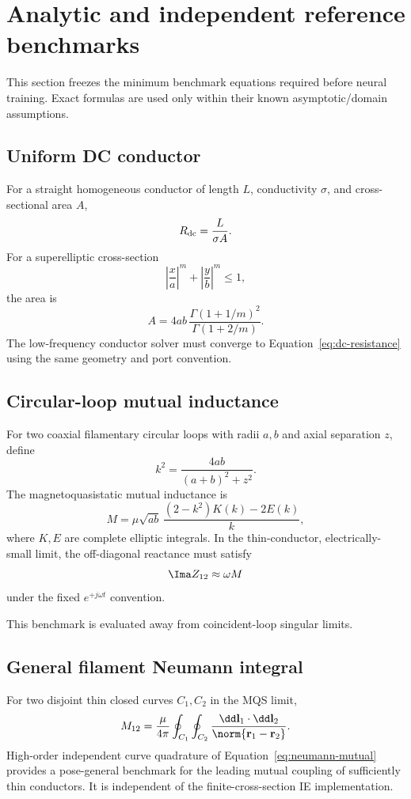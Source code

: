 \section{Analytic and independent reference benchmarks}
\label{sec:analytic-benchmarks}

This section freezes the minimum benchmark equations required before neural
training. Exact formulas are used only within their known asymptotic/domain
assumptions.

\subsection{Uniform DC conductor}

For a straight homogeneous conductor of length $L$, conductivity $\sigma$, and
cross-sectional area $A$,
\[
  R_{\rm dc}
  =
  \frac{L}{\sigma A}.
  \label{eq:dc-resistance}
\]
For a superelliptic cross-section
\[
 \left|\frac{x}{a}\right|^m+
 \left|\frac{y}{b}\right|^m\le1,
\]
the area is
\[
 A
 =
 4ab\,
 \frac{\Gamma(1+1/m)^2}
      {\Gamma(1+2/m)}.
 \label{eq:superellipse-area}
\]
The low-frequency conductor solver must converge to
Equation~\eqref{eq:dc-resistance} using the same geometry and port convention.

\subsection{Circular-loop mutual inductance}

For two coaxial filamentary circular loops with radii $a,b$ and axial
separation $z$, define
\[
  k^2
  =
  \frac{4ab}{(a+b)^2+z^2}.
\]
The magnetoquasistatic mutual inductance is
\[
  M
  =
  \mu\sqrt{ab}\,
  \frac{(2-k^2)K(k)-2E(k)}{k},
  \label{eq:coaxial-mutual}
\]
where $K,E$ are complete elliptic integrals. In the thin-conductor,
electrically-small limit, the off-diagonal reactance must satisfy
\[
  \Ima Z_{12}
  \approx
  \omega M
\]
under the fixed $e^{+j\omega t}$ convention.

This benchmark is evaluated away from coincident-loop singular limits.

\subsection{General filament Neumann integral}

For two disjoint thin closed curves $C_1,C_2$ in the MQS limit,
\[
  M_{12}
  =
  \frac{\mu}{4\pi}
  \oint_{C_1}\oint_{C_2}
  \frac{\dd\mathbf l_1\cdot\dd\mathbf l_2}
       {\norm{\mathbf r_1-\mathbf r_2}}.
  \label{eq:neumann-mutual}
\]
High-order independent curve quadrature of
Equation~\eqref{eq:neumann-mutual} provides a pose-general benchmark for the
leading mutual coupling of sufficiently thin conductors. It is independent of
the finite-cross-section IE implementation.

